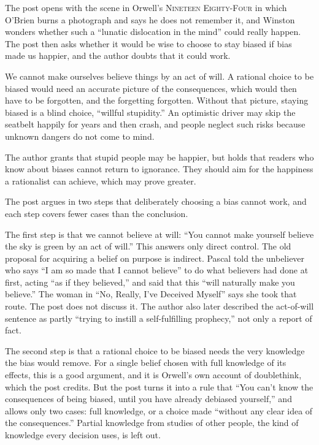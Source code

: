 \begin{afterword}
\summaryhead

The post opens with the scene in Orwell's \textsc{Nineteen Eighty-Four} in which O'Brien burns a photograph and says he does not remember it, and Winston wonders whether such a ``lunatic dislocation in the mind'' could really happen. The post then asks whether it would be wise to choose to stay biased if bias made us happier, and the author doubts that it could work.

We cannot make ourselves believe things by an act of will. A rational choice to be biased would need an accurate picture of the consequences, which would then have to be forgotten, and the forgetting forgotten. Without that picture, staying biased is a blind choice, ``willful stupidity.'' An optimistic driver may skip the seatbelt happily for years and then crash, and people neglect such risks because unknown dangers do not come to mind.

The author grants that stupid people may be happier, but holds that readers who know about biases cannot return to ignorance. They should aim for the happiness a rationalist can achieve, which may prove greater.

\responsehead

The post argues in two steps that deliberately choosing a bias cannot work, and each step covers fewer cases than the conclusion.

The first step is that we cannot believe at will: ``You cannot make yourself believe the sky is green by an act of will.'' This answers only direct control. The old proposal for acquiring a belief on purpose is indirect. Pascal told the unbeliever who says ``I am so made that I cannot believe'' to do what believers had done at first, acting ``as if they believed,'' and said that this ``will naturally make you believe.'' The woman in ``No, Really, I've Deceived Myself'' says she took that route. The post does not discuss it. The author also later described the act-of-will sentence as partly ``trying to instill a self-fulfilling prophecy,'' not only a report of fact.

The second step is that a rational choice to be biased needs the very knowledge the bias would remove. For a single belief chosen with full knowledge of its effects, this is a good argument, and it is Orwell's own account of doublethink, which the post credits. But the post turns it into a rule that ``You can't know the consequences of being biased, until you have already debiased yourself,'' and allows only two cases: full knowledge, or a choice made ``without any clear idea of the consequences.'' Partial knowledge from studies of other people, the kind of knowledge every decision uses, is left out.


\end{afterword}
